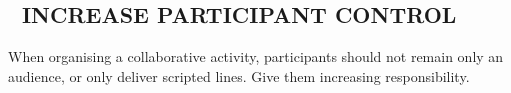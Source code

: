 \subsection*{💎 INCREASE PARTICIPANT CONTROL {\hfill \motor}}

When organising a collaborative activity, participants should not
remain only an audience, or only deliver scripted lines.  Give them
increasing responsibility.
